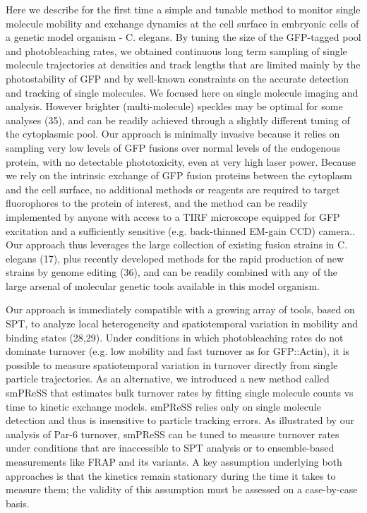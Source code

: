  Here we describe for the first time a simple and tunable method to monitor single molecule mobility and exchange dynamics at the cell surface in embryonic cells of a genetic model organism - C. elegans. By tuning the size of the GFP-tagged pool and photobleaching rates, we obtained continuous long term sampling of single molecule trajectories at densities and track lengths that are limited mainly by the photostability of GFP and by well-known constraints on the accurate detection and tracking of single molecules. We focused here on single molecule imaging and analysis. However brighter (multi-molecule) speckles may be optimal for some analyses (35), and can be readily achieved through a slightly different tuning of the cytoplasmic pool. Our approach is minimally invasive because it relies on sampling very low levels of GFP fusions over normal levels of the endogenous protein, with no detectable phototoxicity, even at very high laser power. Because we rely on the intrinsic exchange of GFP fusion proteins between the cytoplasm and the cell surface, no additional methods or reagents are required to target fluorophores to the protein of interest, and the method can be readily implemented by anyone with access to a TIRF microscope equipped for GFP excitation and a sufficiently sensitive (e.g. back-thinned EM-gain CCD) camera.. Our approach thus leverages the large collection of existing fusion strains in C. elegans (17), plus recently developed methods for the rapid production of new strains by genome editing (36), and can be readily combined with any of the large arsenal of molecular genetic tools available in this model organism.
 
 
 Our approach is immediately compatible with a growing array of tools, based on SPT, to analyze local heterogeneity and spatiotemporal variation in mobility and binding states (28,29). Under conditions in which photobleaching rates do not dominate turnover (e.g. low mobility and fast turnover as for GFP::Actin), it is possible to measure spatiotemporal variation in turnover directly from single particle trajectories. As an alternative, we introduced a new method called smPReSS that estimates bulk turnover rates by fitting single molecule counts vs time to kinetic exchange models. smPReSS relies only on single molecule detection and thus is insensitive to particle tracking errors. As illustrated by our analysis of Par-6 turnover, smPReSS can be tuned to measure turnover rates under conditions that are inaccessible to SPT analysis or to ensemble-based measurements like FRAP and its variants. A key assumption underlying both approaches is that the kinetics remain stationary during the time it takes to measure them; the validity of this assumption must be assessed on a case-by-case basis.
 
